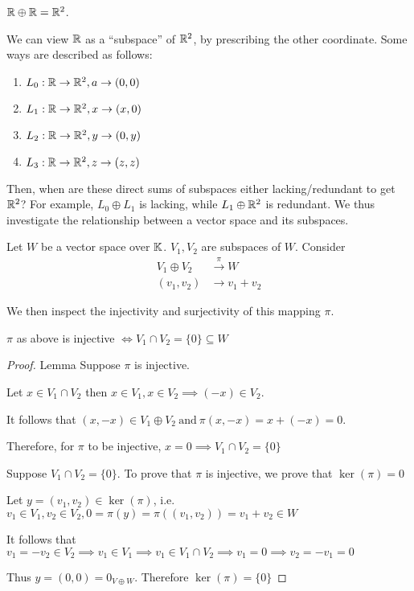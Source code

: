 \begin{example}
    \(\mathbb{R} \oplus \mathbb{R} = \mathbb{R}^2\).

    We can view \(\mathbb{R}\) as a ``subspace'' of \(\mathbb{R}^2\), by prescribing the other coordinate. Some ways are described as follows:
    \begin{enumerate}
        \item \(L_0: \mathbb{R} \to \mathbb{R}^2, a \to (0, 0)\)
        \item \(L_1: \mathbb{R} \to \mathbb{R}^2, x \to (x, 0)\)
        \item \(L_2: \mathbb{R} \to \mathbb{R}^2, y \to (0, y)\)
        \item \(L_3: \mathbb{R} \to \mathbb{R}^2, z \to (z, z)\)
    \end{enumerate}

    Then, when are these direct sums of subspaces either lacking/redundant to get \(\mathbb{R}^2\)? For example, \(L_0 \oplus L_1\) is lacking, while \(L_1 \oplus \mathbb{R}^2\) is redundant. We thus investigate the relationship between a vector space and its subspaces.
\end{example}

Let \(W\) be a vector space over \(\mathbb{K}\). \(V_1, V_2\) are subspaces of \(W\). Consider 
\begin{align*}
    V_1 \oplus V_2 &\xrightarrow{\pi} W \\
    (v_1, v_2) &\xrightarrow{} v_1 + v_2
\end{align*}

We then inspect the injectivity and surjectivity of this mapping \(\pi\).

\begin{lemma}
    \(\pi\) as above is injective \(\Leftrightarrow V_1 \cap V_2 = \{0\} \subseteq W\)
\end{lemma}

\begin{proof} {Lemma}
    \pffwd Suppose \(\pi\) is injective.

    Let \(x \in V_1 \cap V_2\) then \(x \in V_1, x \in V_2 \implies (-x) \in V_2\).

    It follows that \((x, -x) \in V_1 \oplus V_2 \:\text{and}\: \pi(x, -x) = x + (-x) = 0\).

    Therefore, for \(\pi\) to be injective, \(x = 0 \implies V_1 \cap V_2 = \{0\}\)

    \pfbwd Suppose \(V_1 \cap V_2 = \{0\}\). To prove that  \(\pi\) is injective, we prove that \(\ker(\pi) = {0}\)

    Let \(y = (v_1, v_2) \in \ker(\pi)\), i.e. \(v_1 \in V_1, v_2 \in V_2, 0 = \pi(y) = \pi((v_1, v_2)) = v_1 + v_2 \in W\)

    It follows that \(v_1 = -v_2 \in V_2 \implies v_1 \in V_1 \implies v_1 \in V_1 \cap V_2 \implies v_1 = 0 \implies v_2 = -v_1 = 0\)

    Thus \(y = (0, 0) = 0_{V \oplus W}\). Therefore \(\ker(\pi) = \{0\}\)
\end{proof}

